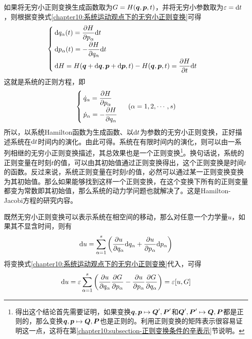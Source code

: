 如果将无穷小正则变换生成函数取为$G = H(\boldsymbol{q},\boldsymbol{p},t)$，并将无穷小参数取为$\varepsilon = \mathrm{d} t$，则根据变换式\eqref{chapter10:系统运动观点下的无穷小正则变换}可得
\begin{equation}
\begin{cases}
	\displaystyle \mathrm{d} q_\alpha(t) = \frac{\partial H}{\partial p_\alpha} \mathrm{d} t \\[1.5ex]
	\displaystyle \mathrm{d} p_\alpha(t) = -\frac{\partial H}{\partial q_\alpha} \mathrm{d} t \\[1.5ex]
	\displaystyle \mathrm{d} H = H(\boldsymbol{q}+\mathrm{d} \boldsymbol{q},\boldsymbol{p}+\mathrm{d} \boldsymbol{p},t) - H(\boldsymbol{q},\boldsymbol{p},t) = \frac{\partial H}{\partial t} \mathrm{d} t
\end{cases}
\end{equation}
这就是系统的正则方程，即
\begin{equation*}
\begin{cases}
	\displaystyle \dot{q}_\alpha = \frac{\partial H}{\partial p_\alpha} \\[1.5ex]
	\displaystyle \dot{p}_\alpha = -\frac{\partial H}{\partial q_\alpha}
\end{cases}\,\, (\alpha=1,2,\cdots,s)
\end{equation*}
所以，以系统Hamilton函数为生成函数、以$\mathrm{d} t$为参数的无穷小正则变换，正好描述系统在$\mathrm{d} t$时间内的演化。由此可得。系统在有限时间内的演化，则可以由一系列相继的无穷小正则变换描述，其总效果也是一个正则变换\label{chapter10:footnote-正则变换的传递性}\footnote{得出这个结论首先需要证明，如果变换$\boldsymbol{q},\boldsymbol{p} \mapsto \boldsymbol{Q}',\boldsymbol{P}'$和$\boldsymbol{Q}',\boldsymbol{P}' \mapsto \boldsymbol{Q},\boldsymbol{P}$都是正则的，那么变换$\boldsymbol{q},\boldsymbol{p} \mapsto \boldsymbol{Q},\boldsymbol{P}$也是正则的。利用正则变换的矩阵表示很容易证明这一点，这将在第\ref{chapter10:subsection-正则变换条件的辛表示}节说明。}。换句话说，系统的正则变量在时刻$t$的值，可以由其初始值通过正则变换得出，这个正则变换是时间$t$的函数。反过来说，系统正则变量在时刻$t$的值，必然可以通过某一正则变换变换为其初始值。那么如果能够找到这样一个正则变换，在这个变换下所有的正则变量都变为常数即其初始值，那么系统的动力学问题也就解决了。这是Hamilton-Jacobi方程的研究内容。

既然无穷小正则变换可以表示系统在相空间的移动，那么对任意一个力学量$u$，如果其不显含时间，则有
\begin{equation}
	\mathrm{d} u = \sum_{\alpha=1}^s \left(\frac{\partial u}{\partial q_\alpha} \mathrm{d} q_\alpha + \frac{\partial u}{\partial p_\alpha}\mathrm{d} p_\alpha\right)
	\label{chapter10:无穷小正则变换与运动积分1}
\end{equation}
将变换式\eqref{chapter10:系统运动观点下的无穷小正则变换}代入，可得
\begin{equation}
	\mathrm{d} u = \varepsilon\sum_{\alpha=1}^s \left(\frac{\partial u}{\partial q_\alpha} \frac{\partial G}{\partial p_\alpha} - \frac{\partial u}{\partial p_\alpha} \frac{\partial G}{\partial q_\alpha}\right) = \varepsilon [u,G]
	\label{chapter10:无穷小正则变换与运动积分2}
\end{equation}


